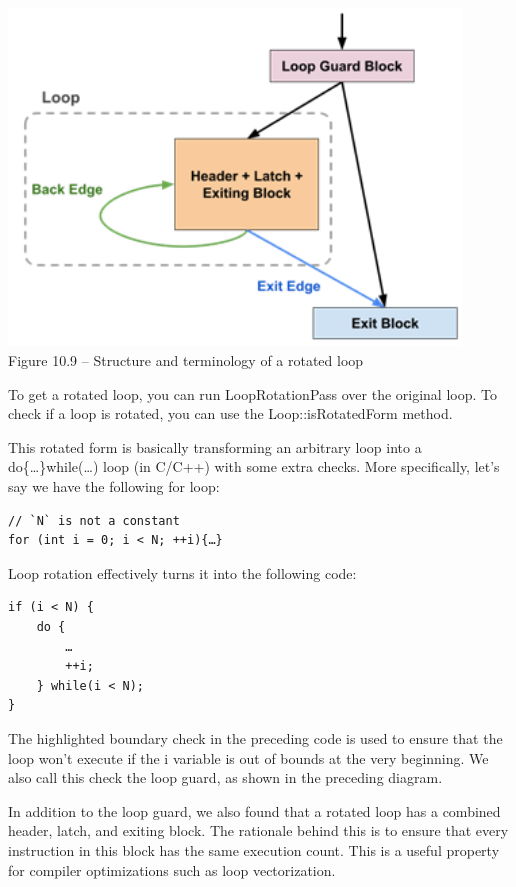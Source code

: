 \hspace*{\fill} \\ %
\begin{center}
\includegraphics[width=0.9\textwidth]{content/3/chapter10/images/9.png}\\
Figure 10.9 – Structure and terminology of a rotated loop
\end{center}

To get a rotated loop, you can run LoopRotationPass over the original loop. To check if a loop is rotated, you can use the Loop::isRotatedForm method.

This rotated form is basically transforming an arbitrary loop into a do\{…\}while(…) loop (in C/C++) with some extra checks. More specifically, let's say we have the following for loop:

\begin{lstlisting}[style=styleCXX]
// `N` is not a constant
for (int i = 0; i < N; ++i){…}
\end{lstlisting}

Loop rotation effectively turns it into the following code:

\begin{lstlisting}[style=styleCXX]
if (i < N) {
	do {
		…
		++i;
	} while(i < N);
}
\end{lstlisting}

The highlighted boundary check in the preceding code is used to ensure that the loop won't execute if the i variable is out of bounds at the very beginning. We also call this check the loop guard, as shown in the preceding diagram.

In addition to the loop guard, we also found that a rotated loop has a combined header, latch, and exiting block. The rationale behind this is to ensure that every instruction in this block has the same execution count. This is a useful property for compiler optimizations such as loop vectorization.

